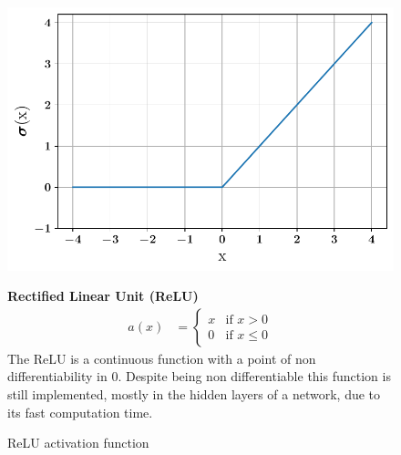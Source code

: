 \begin{figure}[!h]
\begin{minipage}{0.45\textwidth}
    \centering
\includegraphics[width=\textwidth]{images/networks/act_relu.pdf}
\caption{ReLU activation function}
    \label{fig:act_relu}
\end{minipage}
\hfill
\begin{minipage}{0.5\textwidth}
    \textbf{Rectified Linear Unit (ReLU)}
   \begin{align}
        a(x) &=
        \begin{cases}
        x   & \text{if } x > 0 \\
        0  & \text{if } x \leq 0 
  \end{cases}
\end{align}
The ReLU is a continuous function with a point of non differentiability in 0. Despite being non differentiable this function is still implemented, mostly in the hidden layers of a network, due to its fast computation time. 
\end{minipage}
\end{figure}

